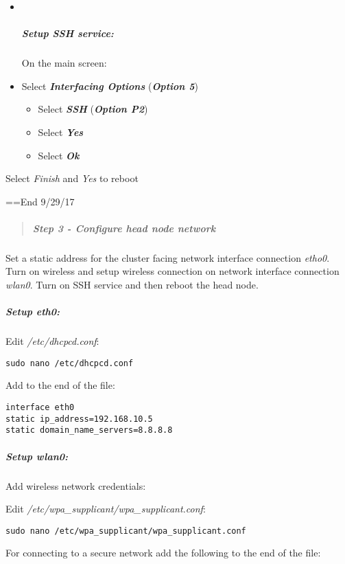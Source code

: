 \documentclass[]{article}
\providecommand{\tightlist}{%
  \setlength{\itemsep}{0pt}\setlength{\parskip}{0pt}}
\let\oldsubparagraph\subparagraph
\renewcommand{\subparagraph}[1]{\oldsubparagraph{#1}\mbox{}}
\begin{document}
\begin{itemize}
\item ~
  \subparagraph{Setup SSH service:}\label{setup-ssh-service}

  On the main screen:
\item
  Select \emph{\textbf{Interfacing Options}} (\emph{\textbf{Option 5}})

  \begin{itemize}
  \tightlist
  \item
    Select \emph{\textbf{SSH}} (\emph{\textbf{Option P2}})
  \item
    Select \emph{\textbf{Yes}}
  \item
    Select \emph{\textbf{Ok}}
  \end{itemize}
\end{itemize}

Select \emph{Finish} and \emph{Yes} to reboot

==End 9/29/17

\begin{quote}
\mbox{}%
\subparagraph{Step 3 - Configure head node
network}\label{step-3---configure-head-node-network}
\end{quote}

Set a static address for the cluster facing network interface connection
\emph{etho0}. Turn on wireless and setup wireless connection on network
interface connection \emph{wlan0}. Turn on SSH service and then reboot
the head node.

\subparagraph{\texorpdfstring{Setup
\emph{eth0}:}{Setup eth0:}}\label{setup-eth0}

Edit \emph{/etc/dhcpcd.conf}:

\texttt{sudo\ nano\ /etc/dhcpcd.conf}

Add to the end of the file:

\begin{verbatim}
interface eth0
static ip_address=192.168.10.5
static domain_name_servers=8.8.8.8
\end{verbatim}

\subparagraph{\texorpdfstring{Setup
\emph{wlan0}:}{Setup wlan0:}}\label{setup-wlan0}

Add wireless network credentials:

Edit \emph{/etc/wpa\_supplicant/wpa\_supplicant.conf}:

\texttt{sudo\ nano\ /etc/wpa\_supplicant/wpa\_supplicant.conf}

For connecting to a secure network add the following to the end of the
file:
\end{document}
